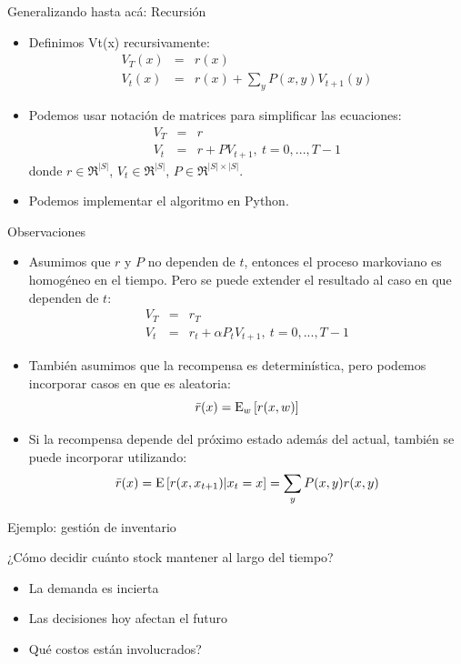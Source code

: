 \documentclass{beamer}
\begin{document}
\begin{frame}{Generalizando hasta ac\'a: Recursi\'on}
\begin{itemize}
\item Definimos Vt(x) recursivamente:
{\small $$
\begin{array}{ccl}
V_T(x) & = & r(x) \\
V_t(x) & = & r(x) +  \sum\limits_y P(x,y) V_{t+1}(y) 
\end{array}
$$}
\item<4-> Podemos usar notación de matrices para simplificar las ecuaciones:
$$
\begin{array}{ccl}
V_T &=& r \\
V_t & = & r+ P V_{t+1},~t = 0,...,T-1
\end{array}
$$
donde $r \in \Re^{|S|}$, $V_t \in \Re^{|S|}$, $P \in \Re^{|S|\times|S|}$.
\item<5-> Podemos implementar el algoritmo en Python.
\end{itemize}
\end{frame}

\begin{frame}{Observaciones}
\begin{itemize}
\item Asumimos que $r$ y $P$ no dependen de $t$, entonces el proceso markoviano es homogéneo en el tiempo. Pero se puede extender el resultado al caso en que dependen de $t$: 
$$
\begin{array}{ccl}
V_T &=& r_T \\
V_t & = & r_t+ \alpha P_t V_{t+1},~t = 0,...,T-1
\end{array}
$$
\item<2-> También asumimos que la recompensa es determinística, pero podemos incorporar casos en que es aleatoria:                $$
\bar{r}(x) = {\rm E}_w\left[r(x,w)\right]
$$                          
\item<3-> Si la recompensa depende del próximo estado además del actual, también se puede incorporar utilizando: 
$$
\bar{r}(x) = {\rm E}\left[r(x,x_{t+1})| x_t = x\right] = \sum_y P(x,y)r(x,y)
$$ 
\end{itemize}
\end{frame}

\begin{frame}{Ejemplo: gestión de inventario}

\begin{center}
\large
¿Cómo decidir cuánto stock mantener al largo del tiempo?
\end{center}

\pause

\begin{itemize}
\item La demanda es incierta
\item Las decisiones hoy afectan el futuro
\item \textquestiondown Qu\'e costos est\'an involucrados?
\end{itemize}
\end{frame}
\end{document}
